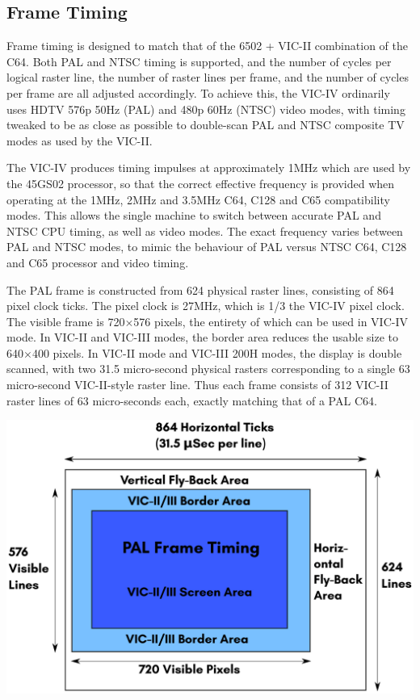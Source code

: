 \subsection{Frame Timing}

Frame timing is designed to match that of the 6502 + VIC-II combination of the C64.  Both PAL and NTSC timing is supported, and the number of cycles per logical raster line, the number of raster lines per frame, and the number of cycles per frame are all adjusted accordingly.  To achieve this, the VIC-IV ordinarily uses HDTV 576p 50Hz (PAL) and 480p 60Hz (NTSC) video modes, with timing tweaked to be as close as possible to double-scan PAL and NTSC composite TV modes as used by the VIC-II.

The VIC-IV produces timing impulses at approximately 1MHz which are used by the 45GS02 processor, so that the correct effective frequency is provided when operating at the 1MHz, 2MHz and 3.5MHz C64, C128 and C65 compatibility modes.  This allows the single machine to switch between accurate PAL and NTSC CPU timing, as well as video modes. The exact frequency varies between PAL and NTSC modes, to mimic the behaviour of PAL versus NTSC C64, C128 and C65 processor and video timing.

The PAL frame is constructed from 624 physical raster lines, consisting of 864 pixel clock ticks. The pixel clock is 27MHz, which is 1/3 the VIC-IV pixel clock.  The visible frame is 720$\times$576 pixels, the entirety of which can be used in VIC-IV mode. In VIC-II and VIC-III modes, the border area reduces the usable size to 640$\times$400 pixels.  In VIC-II mode and VIC-III 200H modes, the display is double scanned, with two 31.5 micro-second physical rasters corresponding to a single 63 micro-second VIC-II-style raster line.  Thus each frame consists of 312 VIC-II raster lines of 63 micro-seconds each, exactly matching that of a PAL C64.

\includegraphics[width=\linewidth]{images/illustrations/VIC-IV-PAL-Frame.pdf}

